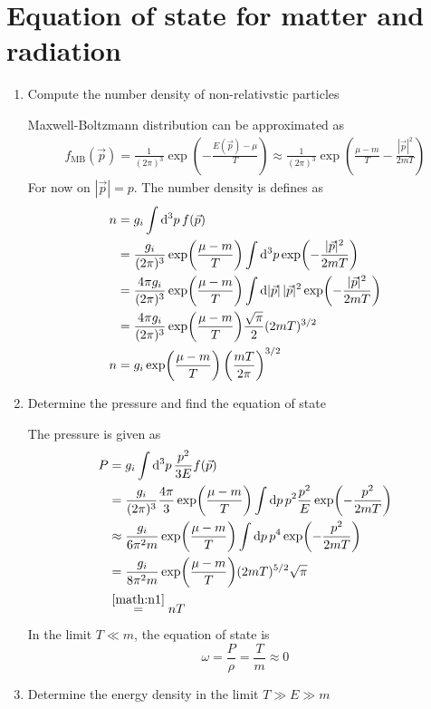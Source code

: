 \section{Equation of state for matter and radiation}

\begin{enumerate}[label=(\alph*)]
   \item Compute the number density of non-relativstic particles
   
      Maxwell-Boltzmann distribution can be approximated as
      \begin{align*}
         f_\text{MB}(\vec{p}) = \frac{1}{(2\pi)^3} \exp(-\frac{E(\vec{p}) - \mu}{T}) \approx \frac{1}{(2\pi)^3} \exp(\frac{\mu - m }{T} - \frac{|\vec{p}|^2}{2mT})
      \end{align*}
      For now on $|\vec{p}| = p$.
      The number density is defines as
      \begin{align}
         n &= g_i \int \dd[3]{p} f(\vec{p}) \notag \\
           &= \frac{g_i}{(2\pi)^3} \exp(\frac{\mu-m}{T}) \int \dd[3]{p} \exp(-\frac{|\vec{p}|^2}{2mT}) \notag\\
           &= \frac{4 \pi g_i}{(2\pi)^3} \exp(\frac{\mu-m}{T}) \int \dd{|\vec{p}|} |\vec{p}|^2 \exp(-\frac{|\vec{p}|^2}{2mT}) \notag\\
           &= \frac{4 \pi g_i}{(2\pi)^3} \exp(\frac{\mu-m}{T}) \frac{\sqrt{\pi}}{2} (2mT)^{3/2} \notag\\
         n &= g_i \exp(\frac{\mu-m}{T}) \left( \frac{mT}{2\pi} \right)^{3/2} \label{math:n1}
      \end{align}
   \item Determine the pressure and find the equation of state

         The pressure is given as
         \begin{align}
            P &= g_i \int \dd[3]{p} \frac{p^2}{3 E} f(\vec{p}) \notag \\
              &= \frac{g_i}{(2\pi)^3} \frac{4\pi}{3} \exp(\frac{\mu-m}{T}) \int \dd{p} p^2 \frac{p^2}{E} \exp(-\frac{p^2}{2mT}) \notag \\
              &\approx \frac{g_i}{6\pi^2 m }  \exp(\frac{\mu-m}{T}) \int \dd{p} p^4 \exp(-\frac{p^2}{2mT}) \notag \\
              &= \frac{g_i}{8\pi^2 m }  \exp(\frac{\mu-m}{T})  (2mT)^{5/2} \sqrt{\pi} \notag  \\
              &\stackrel{\ref{math:n1}}{=} nT \label{math:p1}
         \end{align}
         In the limit $T \ll m$, the equation of state is
         \begin{equation}
            \omega = \frac{P}{\rho} = \frac{T}{m} \approx 0
         \end{equation}
      \item Determine the energy density in the limit $T \gg E \gg m$


\end{enumerate}
